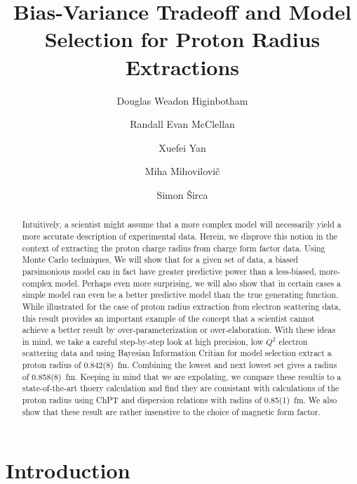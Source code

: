\documentclass[10pt,aps,prc,twocolumn]{revtex4-1}
\begin{document}
\title{Bias-Variance Tradeoff and Model Selection for Proton Radius Extractions}

\author{Douglas Weadon Higinbotham}
\author{Randall Evan McClellan}

\author{Xuefei Yan}

\author{Miha Mihovilovi\v{c}}
\author{Simon \v{S}irca}

\begin{abstract}
Intuitively, a scientist might assume that a more complex model will necessarily yield a more 
accurate description of experimental data.   Herein, we disprove this notion in the context of extracting 
the proton charge radius from charge form factor data.   Using Monte Carlo techniques, We will show that 
for a given set of data, a biased parsimonious model can in fact have greater predictive power than a 
less-biased, more-complex model.  Perhaps even more surprising, we will also show that in certain cases a simple model 
can even be a better predictive model than the true generating function.   While illustrated for the case of proton
radius extraction from electron scattering data, this result provides an important example of the concept that a scientist 
cannot achieve a better result by over-parameterization or over-elaboration.   With these ideas in mind, we take a careful 
step-by-step look at high precision, low $Q^2$ electron scattering data and using Bayesian Information Critian for model selection
extract a proton radius of 0.842(8)~fm.  Combining the lowest and next lowest set gives a radius of 0.858(8)~fm.  Keeping in mind 
that we are expolating, we compare these resultis to a state-of-the-art thoery calculation and find they are consistant with
calculations of the proton radius using ChPT and dispersion relations with radius of 0.85(1)~fm.   We also show that these
result are rather insenstive to the choice of magnetic form factor.
\end{abstract}

\maketitle

\section{Introduction}
\end{document}
